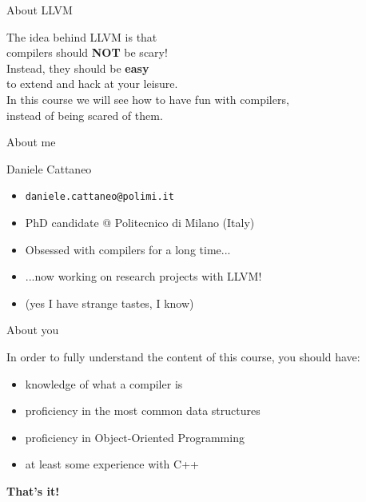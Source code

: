 \begin{frame}{About LLVM}
  \begin{center}
  	\vfill
  	\large
  	The idea behind LLVM is that \\ compilers should \textbf{NOT} be scary! \\
		\bigskip
		Instead, they should be \textbf{easy} \\ to extend and hack at your leisure. \\
		\bigskip
		In this course we will see how to have fun with compilers, \\instead of being scared of them.
		\vfill
  \end{center}
\end{frame}


\begin{frame}{About me}
  \begin{large}
  \begin{center}
    Daniele Cattaneo
  \end{center}
  \end{large}
  \vspace{0.5em}
  \begin{center}
  \begin{varwidth}{8cm}
    \begin{itemize}
    \item \texttt{daniele.cattaneo@polimi.it}
    \item PhD candidate @ Politecnico di Milano (Italy)
    \item Obsessed with compilers for a long time...
    \item ...now working on research projects with LLVM!
    \item (yes I have strange tastes, I know)
  \end{itemize}
  \end{varwidth}
  \end{center}
\end{frame}


\begin{frame}{About you}
	\begin{center}
  \begin{varwidth}{8.5cm}
  In order to fully understand the content of this course,
  you should have:
  \smallskip
  \begin{itemize}
    \item knowledge of what a compiler is
    \item proficiency in the most common data structures
    \item proficiency in Object-Oriented Programming
    \item at least some experience with C++
  \end{itemize}
  \end{varwidth}
  \medskip
  \end{center}
   \begin{center}
  \textbf{\large That's it!}
  \end{center}
\end{frame}


